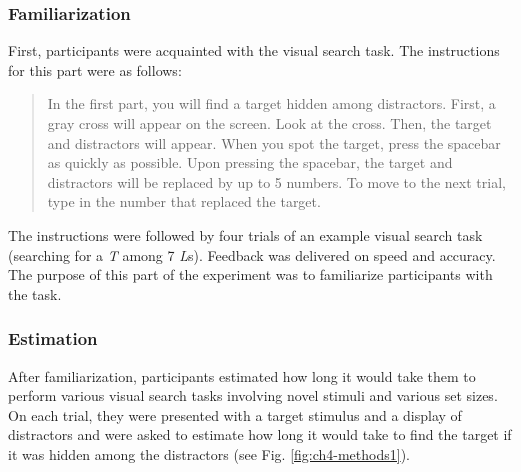 \documentclass[12pt,twoside]{reedthesis}
\begin{document}
\hypertarget{familiarization}{%
\subsubsection*{Familiarization}\label{familiarization}}

First, participants were acquainted with the visual search task. The instructions for this part were as follows:
\begin{quote}
In the first part, you will find a target hidden among distractors. First, a gray cross will appear on the screen. Look at the cross. Then, the target and distractors will appear. When you spot the target, press the spacebar as quickly as possible. Upon pressing the spacebar, the target and distractors will be replaced by up to 5 numbers. To move to the next trial, type in the number that replaced the target.
\end{quote}
The instructions were followed by four trials of an example visual search task (searching for a \emph{T} among 7 \emph{L}s). Feedback was delivered on speed and accuracy. The purpose of this part of the experiment was to familiarize participants with the task.

\hypertarget{estimation}{%
\subsubsection*{Estimation}\label{estimation}}

After familiarization, participants estimated how long it would take them to perform various visual search tasks involving novel stimuli and various set sizes. On each trial, they were presented with a target stimulus and a display of distractors and were asked to estimate how long it would take to find the target if it was hidden among the distractors (see Fig. \ref{fig:ch4-methods1}).
\end{document}
